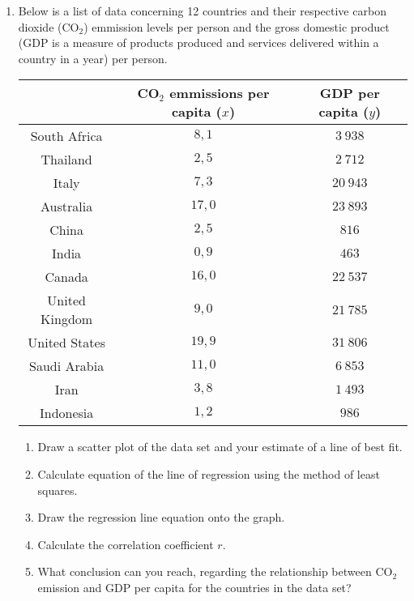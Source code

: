 \begin{eocexercises}{}
\begin{enumerate}
\item Below is a list of data concerning 12 countries and their respective carbon dioxide (CO$_2$) emmission levels per person and the gross domestic product (GDP is a measure of products produced and services delivered within a country in a year) per person. 
\begin{center}
\begin{tabular}{|c|c|c|}\hline
 & CO$_2$ emmissions per capita ($x$) & GDP per capita ($y$) \\\hline
 South Africa & $8,1$ & $3~938$ \\\hline 
 Thailand & $2,5$ & $2~712$ \\\hline
 Italy & $7,3$ & $20~943$ \\\hline
 Australia & $17,0$ & $23~893$ \\\hline
 China & $2,5$ & $816$ \\\hline
 India & $0,9$ & $463$\\\hline
 Canada & $16,0$ & $22~537$ \\\hline
 United Kingdom & $9,0$ & $21~785$ \\\hline
 United States & $19,9$ & $31~806$ \\\hline
 Saudi Arabia & $11,0$ & $6~853$ \\\hline
 Iran & $3,8$ & $1~493$ \\\hline
 Indonesia & $1,2$ & $986$ \\\hline
\end{tabular}
\end{center}
\begin{enumerate}
\item Draw a scatter plot of the data set and your estimate of a line of best fit.
\item Calculate equation of the line of regression using the method of least squares.
\item Draw the regression line equation onto the graph.
\item Calculate the correlation coefficient $r$.
\item What conclusion can you reach, regarding the relationship between CO$_2$ emission and GDP per capita for the countries in the data set?
\end{enumerate}


\end{enumerate}
\end{eocexercises}
